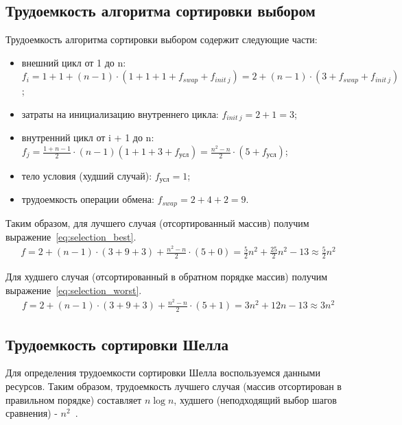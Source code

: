 \documentclass[12pt]{report}
\begin{document}
    \subsection{Трудоемкость алгоритма сортировки выбором}
    Трудоемкость алгоритма сортировки выбором содержит следующие части:
    \begin{itemize}
        \item внешний цикл от 1 до n: $f_i = 1 + 1 + (n - 1)\cdot(1 + 1 + 1 + f_{swap} + f_{init\ j}) =
        2 + (n - 1)\cdot(3 + f_{swap} + f_{init\ j})$;
        \item затраты на инициализацию внутреннего цикла: $f_{init\ j} = 2 + 1 = 3$;
        \item внутренний цикл от i + 1 до n: $f_j = \frac{1 + n - 1}{2} \cdot (n -1) (1 + 1 + 3 + f_{\text{усл}}) =
        \frac{n^2 - n}{2} \cdot(5 + f_{\text{усл}})$;
        \item тело условия (худший случай): $f_{\text{усл}} = 1$;
        \item трудоемкость операции обмена: $f_{swap} = 2 + 4 + 2 = 9$.
    \end{itemize}

    Таким образом, для лучшего случая (отсортированный массив) получим выражение~\ref{eq:selection_best}.
    \begin{equation}
        \label{eq:selection_best}
        \begin{array}{ll}
            f = 2 + (n - 1)\cdot(3 + 9 + 3) + \frac{n^2 - n}{2} \cdot(5 + 0) =
            \frac{5}{2} n^2 + \frac{25}{2}n^2 - 13 \approx \frac{5}{2}n^2
        \end{array}
    \end{equation}

    Для худшего случая (отсортированный в обратном порядке массив) получим выражение~\ref{eq:selection_worst}.
    \begin{equation}
        \label{eq:selection_worst}
        \begin{array}{ll}
            f = 2 + (n - 1)\cdot(3 + 9 + 3) + \frac{n^2 - n}{2} \cdot(5 + 1) = 3n^2 + 12n - 13 \approx 3n^2
        \end{array}
    \end{equation}

    \subsection{Трудоемкость сортировки Шелла}
    Для определения трудоемкости сортировки Шелла воспользуемся данными ресурсов.
    Таким образом, трудоемкость лучшего случая (массив отсортирован в правильном порядке) составляет $n\log n$,
    худшего (неподходящий выбор шагов сравнения) - $n^2$~\cite{ShellEff}.
    
\end{document}
